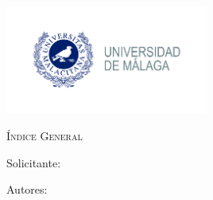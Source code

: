\documentclass[../main.tex]{subfiles}
\begin{document}
\newpage
\thispagestyle{empty}
\begin{center}
    \includegraphics[width=0.5\textwidth]{Imagenes/Logo UMA.jpg}\par
    \vspace{1cm}
    {\bfseries\LARGE \Facultad \par}
    \vspace{0.5cm}
    {\scshape\Large \Grado \par}
    \vspace{3cm}
    {\scshape\Huge Índice General \par}
    \vspace{1.5cm}
    {\itshape\Large \TituloProyecto \par}
    \vfill
    {\Large Solicitante: \par}
    {\Large \Solicitante  \par}
    \vspace{1cm}
    {\Large Autores: \par}
    {\Large \Autora \par}
    {\Large \Autor \par}
    \vfill
    {\Large \Fecha \par}
\end{center}

\tableofcontents
\end{document}
